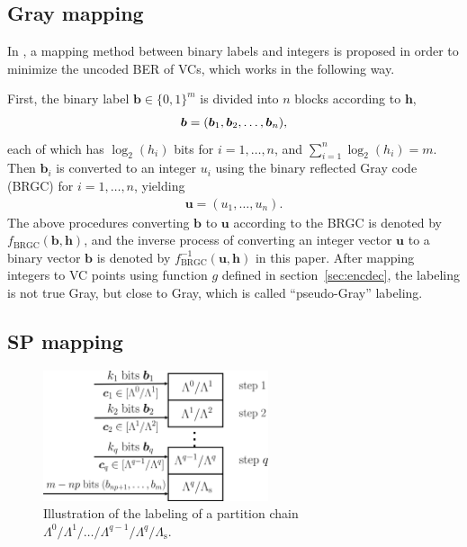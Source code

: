 \documentclass[journal]{IEEEtran}
\newcommand{\bb}{\boldsymbol{b}}
\newcommand{\bh}{\boldsymbol{h}}
\newcommand{\bu}{\boldsymbol{u}}
\newcommand{\Lambdas}{\Lambda_\mathrm{s}}
\begin{document}
\subsection{Gray mapping}\label{sec:pseudo}
In \cite{ourISIT}, a mapping method between binary labels and integers is proposed in order to minimize the uncoded BER of VCs, which works in the following way. 


First, the binary label $\bb\in \{0,1\}^m$ is divided into $n$ blocks according to $\bh$,
\begin{align}
    \bb=(\bb_1,\bb_2,\ldots,\bb_n),\notag
\end{align}
each of which has $\log_2(h_i)$ bits for $i=1,\ldots,n$, and $\sum_{i=1}^n{\log_2(h_i)}=m$. Then $\bb_i$ is converted to an integer $u_i$ using the binary reflected Gray code (BRGC) \cite{agrellBRGC04} for $i=1,\ldots,n$, yielding 
\begin{align}
    \bu=(u_1,\ldots,u_n).
\end{align}
The above procedures converting $\bb$ to $\bu$ according to the BRGC is denoted by $f_{\text{BRGC}}(\bb,\bh)$, and the inverse process of converting an integer vector $\bu$ to a binary vector $\bb$ is denoted by $f^{-1}_{\text{BRGC}}(\bu,\bh)$ in this paper. After mapping integers to VC points using function $g$ defined in section~\ref{sec:encdec}, the labeling is not true Gray, but close to Gray, which is called ``pseudo-Gray'' labeling.


\subsection{SP mapping}\label{sec:setpart}

\begin{figure}[tbp]
    \centering
    \includegraphics[width=2.6in]{figures/partition_chain.png}
    \caption{Illustration of the labeling of a partition chain $\Lambda^0/\Lambda^1/\dots/\Lambda^{q-1}/\Lambda^q/\Lambdas$.}
    \label{fig:partition chain}
\end{figure}
\end{document}
